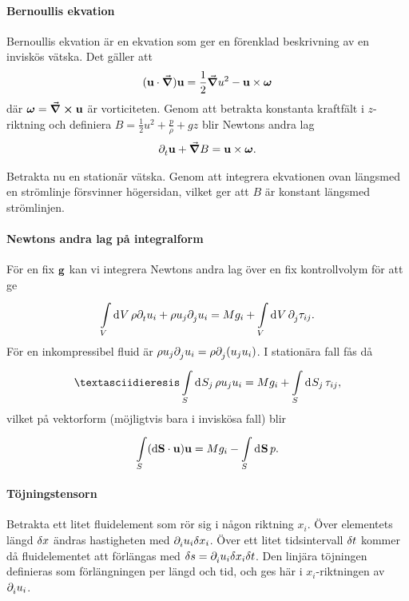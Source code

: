\paragraph{Bernoullis ekvation}
Bernoullis ekvation är en ekvation som ger en förenklad beskrivning av en inviskös vätska. Det gäller att
\begin{align*}
	(\vb{u}\cdot\grad)\vb{u} = \frac{1}{2}\grad{u^{2}} - \vb{u}\times\vb*{\omega}
\end{align*}
där $\vb*{\omega} = \curl{\vb{u}}$ är vorticiteten. Genom att betrakta konstanta kraftfält i $z$-riktning och definiera $B = \frac{1}{2}u^{2} + \frac{p}{\rho} + gz$ blir Newtons andra lag
\begin{align*}
	\partial_{t}^{}\vb{u} + \grad{B} = \vb{u}\times\vb*{\omega}.
\end{align*}

Betrakta nu en stationär vätska. Genom att integrera ekvationen ovan längsmed en strömlinje försvinner högersidan, vilket ger att $B$ är konstant längsmed strömlinjen.

\paragraph{Newtons andra lag på integralform}
För en fix $\vb{g}$ kan vi integrera Newtons andra lag över en fix kontrollvolym för att ge
\begin{align*}
	\int\limits_{V}^{}\dd[]{V}\rho\partial_{t}^{}u_{i} + \rho u_{j}\partial_{j}^{}u_{i} = Mg_{i} + \int\limits_{V}^{}\dd[]{V}\partial_{j}^{}\tau_{ij}.
\end{align*}
För en inkompressibel fluid är $\rho u_{j}\partial_{j}^{}u_{i} = \rho \partial_{j}^{}(u_{j}u_{i})$. I stationära fall fås då
\begin{align*}
¨	\integ{S}{}{S_{j}}{\rho u_{j}u_{i}} = Mg_{i} + \integ{S}{}{S_{j}}{\tau_{ij}},
\end{align*}
vilket på vektorform (möjligtvis bara i inviskösa fall) blir
\begin{align*}
	\int\limits_{S}(\dd{\vb{S}}\cdot\vb{u})\vb{u} = Mg_{i} - \int\limits_{S}^{}\dd[]{\vb{S}}p.
\end{align*}

\paragraph{Töjningstensorn}
Betrakta ett litet fluidelement som rör sig i någon riktning $x_{i}$. Över elementets längd $\delta x$ ändras hastigheten med $\partial_{i}^{}u_{i}\delta x_{i}$. Över ett litet tidsintervall $\delta t$ kommer då fluidelementet att förlängas med $\delta s = \partial_{i}^{}u_{i}\delta x_{i}\delta t$. Den linjära töjningen definieras som förlängningen per längd och tid, och ges här i $x_{i}$-riktningen av $\partial_{i}^{}u_{i}$.

